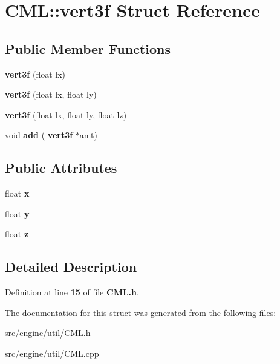 \section{C\+ML\+:\+:vert3f Struct Reference}
\label{struct_c_m_l_1_1vert3f}
\subsection*{Public Member Functions}
\begin{DoxyCompactItemize}
\item 
\mbox{\label{struct_c_m_l_1_1vert3f_acb5c0f9e088dc1a1cd4d3cba0fb1f75f}} 
{\bfseries vert3f} (float lx)
\item 
\mbox{\label{struct_c_m_l_1_1vert3f_a857a55ac348df38257e3efa05170fedf}} 
{\bfseries vert3f} (float lx, float ly)
\item 
\mbox{\label{struct_c_m_l_1_1vert3f_a69f3fe1201b102caf1f8f84354284b20}} 
{\bfseries vert3f} (float lx, float ly, float lz)
\item 
\mbox{\label{struct_c_m_l_1_1vert3f_a378b583d006dde58cb7adec7a1b08134}} 
void {\bfseries add} (\textbf{ vert3f} $\ast$amt)
\end{DoxyCompactItemize}
\subsection*{Public Attributes}
\begin{DoxyCompactItemize}
\item 
\mbox{\label{struct_c_m_l_1_1vert3f_a6f859163dc028b2c73ed45926eee1199}} 
float {\bfseries x}
\item 
\mbox{\label{struct_c_m_l_1_1vert3f_aa7fcd0cd1226f8d2fa09809ceff65968}} 
float {\bfseries y}
\item 
\mbox{\label{struct_c_m_l_1_1vert3f_a2df234b0d9bc7e8174cd02f0ec2e2923}} 
float {\bfseries z}
\end{DoxyCompactItemize}


\subsection{Detailed Description}


Definition at line \textbf{ 15} of file \textbf{ C\+M\+L.\+h}.



The documentation for this struct was generated from the following files\+:\begin{DoxyCompactItemize}
\item 
src/engine/util/C\+M\+L.\+h\item 
src/engine/util/C\+M\+L.\+cpp\end{DoxyCompactItemize}
